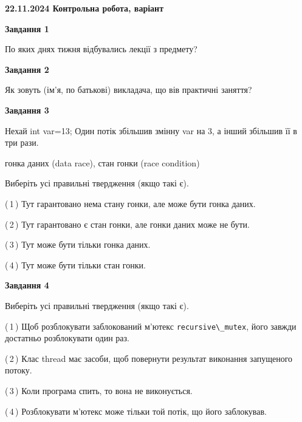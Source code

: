 \documentclass[12pt, ukrainian]{article}
\def\code#1{\Verb!#1!}
\begin{document}
\begin {large}

\textbf{22.11.2024 Контрольна робота, варіант  }\par


{

\begin{center}
\textbf{Завдання 1}
\end{center}

По яких днях тижня відбувались лекції з предмету?


\begin{center}
\textbf{Завдання 2}
\end{center}

Як зовуть (ім'я, по батькові) викладача, що вів практичні заняття?


\begin{center}
\textbf{Завдання 3}
\end{center}

Нехай int var=13; Один потік збільшив змінну var на 3, а інший збільшив її в три рази.

гонка даних (data race), стан гонки (race condition)

Виберіть усі правильні твердження (якщо такі є).\par
\vspace{2mm}
(\,1\,) Тут гарантовано нема стану гонки, але може бути гонка даних.%

(\,2\,) Тут гарантовано є стан гонки, але гонки даних може не бути.%

(\,3\,) Тут може бути тільки гонка даних.%

(\,4\,) Тут може бути тільки стан гонки.%


\begin{center}
\textbf{Завдання 4}
\end{center}

Виберіть усі правильні твердження (якщо такі є).\par
\vspace{2mm}

(\,1\,) Щоб розблокувати заблокований м’ютекс \code{recursive\_mutex}, його завжди достатньо розблокувати один раз.%

(\,2\,) Клас thread має засоби, щоб повернути результат виконання запущеного потоку.%

(\,3\,) Коли програма спить, то вона не виконується.%

(\,4\,) Розблокувати м’ютекс може тільки той потік, що його заблокував.%


}
\end{large}
\end{document}
